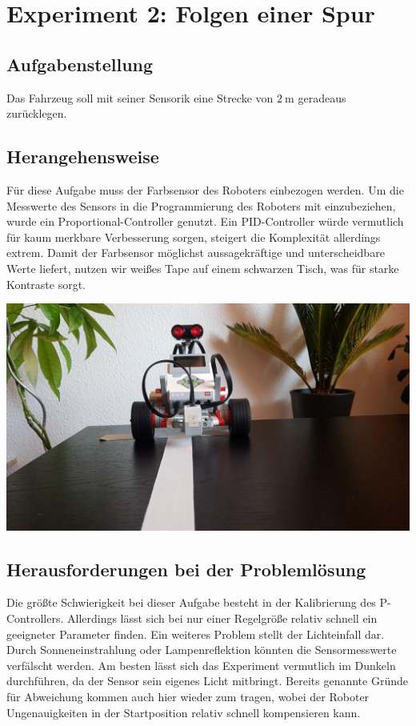 \documentclass[ngerman]{tudscrreprt}
\begin{document}
\section{Experiment 2: Folgen einer Spur}
\subsection{Aufgabenstellung}
Das Fahrzeug soll mit seiner Sensorik eine Strecke von $\SI{2}{\m}$ geradeaus
zurücklegen.

\subsection{Herangehensweise}
Für diese Aufgabe muss der Farbsensor des Roboters einbezogen werden. Um die Messwerte
des Sensors in die Programmierung des Roboters mit einzubeziehen, wurde ein
Proportional-Controller genutzt. Ein PID-Controller würde vermutlich für kaum merkbare
Verbesserung sorgen, steigert die Komplexität allerdings extrem. Damit der Farbsensor
möglichst aussagekräftige und unterscheidbare Werte liefert, nutzen wir weißes Tape auf
einem schwarzen Tisch, was für starke Kontraste sorgt.

\includegraphics[scale=0.5]{src/images/robot_front.jpg}

\subsection{Herausforderungen bei der Problemlösung}
Die größte Schwierigkeit bei dieser Aufgabe besteht in der Kalibrierung des P-Controllers.
Allerdings lässt sich bei nur einer Regelgröße relativ schnell ein geeigneter Parameter
finden. Ein weiteres Problem stellt der Lichteinfall dar. Durch Sonneneinstrahlung oder
Lampenreflektion könnten die Sensormesswerte verfälscht werden. Am besten lässt sich das
Experiment vermutlich im Dunkeln durchführen, da der Sensor sein eigenes Licht mitbringt.
Bereits genannte Gründe für Abweichung kommen auch hier wieder zum tragen, wobei der
Roboter Ungenauigkeiten in der Startposition relativ schnell kompensieren kann.
\end{document}
